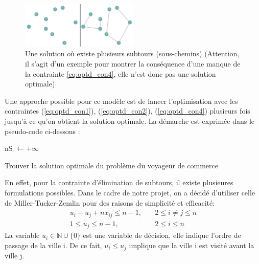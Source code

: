 \documentclass{article}
\begin{document}
\begin{figure}[h]\centering
\includegraphics[width=0.5\textwidth]{graphe_avec_subtour}
\caption{Une solution où existe plusieurs subtours (sous-chemins) (Attention, il s'agit d'un exemple pour montrer la conséquence d'une manque de la contrainte \ref{eq:optd_con4}, elle n'est donc pas une solution optimale)}

\end{figure}
Une approche possible pour ce modèle est de lancer l'optimisation avec les contraintes (\ref{eq:optd_con1}), (\ref{eq:optd_con2}), (\ref{eq:optd_con4}) plusieurs fois jusqu'à ce qu'on obtient la solution optimale. La démarche est exprimée dans le pseudo-code ci-dessous :\\
\begin{algorithm}[H] 
   nS \(\leftarrow +\infty\)  \;
 \caption{Trouver la solution optimale du problème du voyageur de commerce}
\end{algorithm}
En effet, pour la contrainte d'élimination de subtours, il existe plusieures formulations possibles. Dans le cadre de notre projet, on a décidé d'utiliser celle de Miller-Tucker-Zemlin pour des raisons de simplicité et efficacité:
\begin{equation}
\begin{aligned}
	u_i - u_j + nx_{ij} \leq n - 1, \quad & 2 \leq i \neq j \leq n \\
	1 \leq u_j \leq n - 1, \quad & 2 \leq i \leq n
\end{aligned}
\end{equation}
La variable \(u_i \in \mathbb{N} \cup \{0\}\) est une variable de décision, elle indique l'ordre de passage de la ville i. De ce fait, \(u_i \leq u_j\) implique que la ville i est visité avant la ville j.\\
\end{document}
